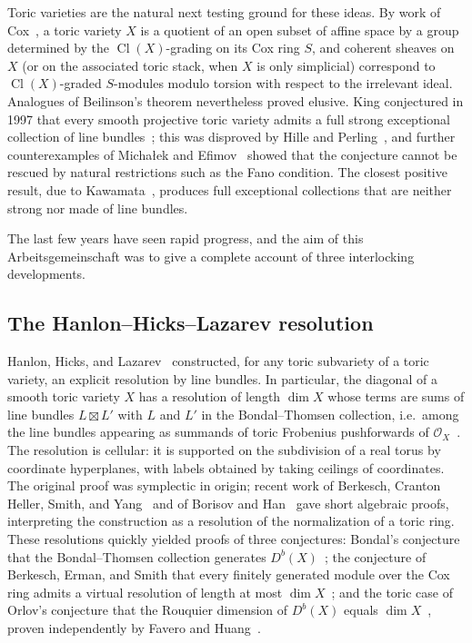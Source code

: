 \documentclass{amsart}
\newcommand{\cO}{\mathcal{O}}
\newcommand{\Db}{D^{b}}
\DeclareMathOperator{\Cl}{Cl}
\begin{document}
Toric varieties are the natural next testing ground for these ideas. By work of
Cox~\cite{Cox95}, a toric variety $X$ is a quotient of an open subset of affine space by a
group determined by the $\Cl(X)$-grading on its Cox ring $S$, and coherent sheaves on $X$
(or on the associated toric stack, when $X$ is only simplicial) correspond to
$\Cl(X)$-graded $S$-modules modulo torsion with respect to the irrelevant ideal. Analogues
of Beilinson's theorem nevertheless proved elusive. King conjectured in 1997 that every
smooth projective toric variety admits a full strong exceptional collection of line
bundles~\cite{Kin97}; this was disproved by Hille and Perling~\cite{HP06}, and further
counterexamples of Micha{\l}ek and Efimov~\cite{Mic11,Efi14} showed that the conjecture
cannot be rescued by natural restrictions such as the Fano condition. The closest positive
result, due to Kawamata~\cite{Kaw06}, produces full exceptional collections that are
neither strong nor made of line bundles.

The last few years have seen rapid progress, and the aim of this Arbeitsgemeinschaft was
to give a complete account of three interlocking developments.

\subsection*{The Hanlon--Hicks--Lazarev resolution}
Hanlon, Hicks, and Lazarev~\cite{HHL24} constructed, for any toric subvariety of a toric
variety, an explicit resolution by line bundles. In particular, the diagonal of a smooth
toric variety $X$ has a resolution of length $\dim X$ whose terms are sums of line bundles
$L\boxtimes L'$ with $L$ and $L'$ in the Bondal--Thomsen collection, i.e.\ among the line
bundles appearing as summands of toric Frobenius pushforwards of
$\cO_X$~\cite{Bon06,Tho00}. The resolution is cellular: it is supported on the subdivision
of a real torus by coordinate hyperplanes, with labels obtained by taking ceilings of
coordinates. The original proof was symplectic in origin; recent work of Berkesch,
Cranton Heller, Smith, and Yang~\cite{BCHSY25} and of Borisov and Han~\cite{BH25} gave
short algebraic proofs, interpreting the construction as a resolution of the
normalization of a toric ring. These resolutions quickly yielded proofs of three
conjectures: Bondal's conjecture that the Bondal--Thomsen collection generates
$\Db(X)$~\cite{Bon06}; the conjecture of Berkesch, Erman, and Smith that every finitely
generated module over the Cox ring admits a virtual resolution of length at most
$\dim X$~\cite{BES20}; and the toric case of Orlov's conjecture that the Rouquier
dimension of $\Db(X)$ equals $\dim X$~\cite{Orl09}, proven independently by Favero and
Huang~\cite{FH23}.
\end{document}
